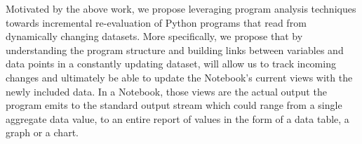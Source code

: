 \documentclass[11pt,letterpaper]{article}
\begin{document}
Motivated by the above work, we propose leveraging program analysis techniques towards incremental re-evaluation of Python programs that read from dynamically changing datasets. More specifically, we propose that by understanding the program structure and building links between variables and data points in a constantly updating dataset, will allow us to track incoming changes and ultimately be able to update the Notebook's current views with the newly included data. In a Notebook, those views are the actual output the program emits to the standard output stream which could range from a single aggregate data value, to an entire report of values in the form of a data table, a graph or a chart.



\end{document}
